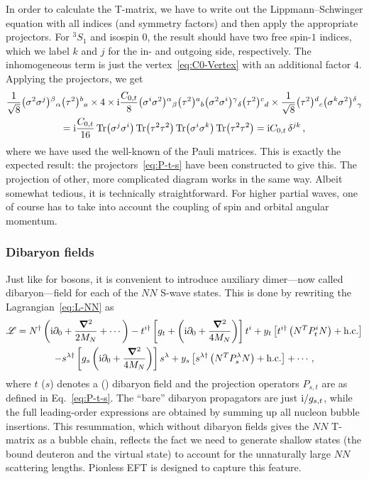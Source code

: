 In order to calculate the T-matrix, we have to write out the Lippmann--Schwinger 
equation with all indices (and symmetry factors) and then apply the appropriate 
projectors.  For ${}^3S_1$ and isospin $0$, the result should have two free 
spin-$1$ indices, which we label $k$ and $j$ for the in- and outgoing side, 
respectively.  The inhomogeneous term is just the vertex~\eqref{eq:C0-Vertex} 
with an additional factor $4$.  Applying the projectors, we get
%
\begin{multline}
 \frac{1}{\sqrt8} \big(\sigma^2\sigma^j\big){}^{\beta}{}_{\alpha} \big(\tau^2\big){}^{b}{}_{a}
 \times 4
 \times \mathrm{i}\frac{C_{0,t}}{8}\big(\sigma^i\sigma^2\big){}^{\alpha}{}_{\beta} \big(\tau^2\big){}^{a}{}_{b}
 \big(\sigma^2\sigma^i\big){}^{\gamma}{}_{\delta} \big(\tau^2\big){}^{c}{}_{d}
 \times \frac{1}{\sqrt8} \big(\tau^2\big){}^{d}{}_{c}
 \big(\sigma^k\sigma^2\big){}^{\delta}{}_{\gamma} \\
 = \mathrm{i}\frac{C_{0,t}}{16} \, \mathrm{Tr}\big(\sigma^j\sigma^i\big)
 \, \mathrm{Tr}\big(\tau^2\tau^2\big)
 \, \mathrm{Tr}\big(\sigma^i\sigma^k\big) \, \mathrm{Tr}\big(\tau^2\tau^2\big)
 = \mathrm{i} C_{0,t} \, \delta^{jk} \,,
\end{multline}
%
where we have used the well-known of the Pauli matrices.  This is 
exactly the expected result: the projectors~\eqref{eq:P-t-s} have been 
constructed to give this.  The projection of other, more complicated diagram 
works in the same way.  Albeit somewhat tedious, it is technically 
straightforward.  For higher partial waves, one of course has to take into 
account the coupling of spin and orbital angular momentum.

\subsubsection{Dibaryon fields}
\label{sec:EFT-Dibaryons}

Just like for bosons, it is convenient to introduce auxiliary dimer---now 
called dibaryon---field for each of the $NN$ S-wave states.  This is done by 
rewriting the Lagrangian~\eqref{eq:L-NN} as
%
\begin{multline}
 \LL
 = N^\dagger \left(\ii\partial_0 + \frac{\Laplace}{2\MN} + \cdots\right)
 - t^{i\dagger}\left[\sigt
 + \left(\ii \partial_0+\frac{\vNabla^2}{4\MN}\right)\right]t^i
 + \yt\left[t^{i\dagger}\left(N^T P^i_t N\right)+\hc\right] \\
 - s^{\lambda\dagger}\left[\sigs
 \left(\ii \partial_0+\frac{\vNabla^2}{4\MN}\right)\right]s^\lambda
 + \ys\left[s^{\lambda\dagger}\left(N^T P^\lambda_s N\right)+\hc\right]
 + \cdots \,,
\label{eq:L-NN-d}
\end{multline}
%
where $t$ ($s$) denotes a \ThreeSOne (\OneSNot) dibaryon field and the 
projection operators $P_{s,t}$ are as defined in Eq.~\eqref{eq:P-t-s}.  The 
``bare'' dibaryon propagators are just $\mathrm{i}/g_{{s,t}}$, while the full 
leading-order expressions are obtained by summing up all nucleon bubble 
insertions.  This resummation, which without dibaryon fields gives the $NN$ 
T-matrix as a bubble chain, reflects the fact we need to generate shallow 
states (the bound deuteron and the virtual \OneSNot state) to account for the 
unnaturally large $NN$ scattering lengths.  Pionless EFT is designed to capture 
this feature.

